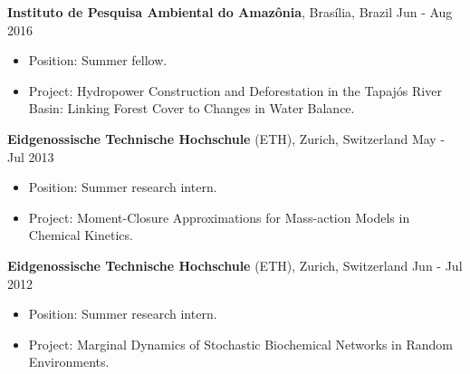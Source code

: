 \documentclass[10pt]{article}
\newenvironment{innerlist}[1][\enskip\textbullet]%
        {\begin{itemize}[#1,leftmargin=*,parsep=0pt,itemsep=0pt,topsep=0pt,partopsep=0pt]}
        {\end{itemize}}
\newcommand{\halfblankline}{\quad\vspace{-0.5\baselineskip}\pagebreak[3]}
\begin{document}
\halfblankline

{\bf Instituto de Pesquisa Ambiental do Amaz\^ onia}, Bras\'{i}lia, Brazil  \hfill Jun - Aug 2016
\vspace{0.03in}
\begin{innerlist}
\item {Position}: Summer fellow. 
\item {Project}: Hydropower Construction and Deforestation in the Tapaj\'{o}s River Basin: Linking Forest Cover to Changes in Water Balance.
\end{innerlist}

\halfblankline

{\bf Eidgenossische Technische Hochschule} (ETH), Zurich, Switzerland \hfill May - Jul 2013
\vspace{0.03in}
\begin{innerlist}
\item {Position}: Summer research intern. 
\item {Project}: Moment-Closure Approximations for Mass-action Models in Chemical Kinetics.
\end{innerlist}

\halfblankline

{\bf Eidgenossische Technische Hochschule} (ETH), Zurich, Switzerland  \hfill Jun - Jul 2012
\vspace{0.03in}
\begin{innerlist}
\item {Position}: Summer research intern.
\item {Project}: Marginal Dynamics of Stochastic Biochemical Networks in Random Environments.
\end{innerlist}
\end{document}
